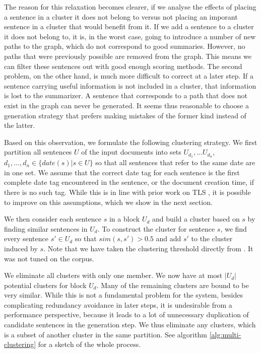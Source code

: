 \documentclass[a4paper,BCOR=10mm]{report}
\numberwithin{lemma}{chapter}
\numberwithin{definition}{chapter}
\begin{document}
The reason for this relaxation becomes clearer, if we analyse the effects of placing a sentence in a cluster it does not belong to versus not placing an imporant sentence in a cluster that would benefit from it.
If we add a sentence to a cluster it does not belong to, it is, in the worst case, going to introduce a number of new paths to the graph, which do not correspond to good summaries. However, no paths that were previously possible are removed from the graph. This means we can filter these sentences out with good enough scoring methods.
The second problem, on the other hand, is much more difficult to correct at a later step. If a sentence carrying useful information is not included in a cluster, that information is lost to the summarizer. A sentence that corresponds to a path that does not exist in the graph can never be generated. It seems thus reasonable to choose a generation strategy that prefers making mistakes of the former kind instead of the latter.

Based on this observation, we formulate the following clustering strategy. We first partition all sentences $U$ of the input documents into sets $U_{d_1}, \dots U_{d_n}$, $d_1, \dots, d_n \in \{ date(s) | s \in U \}$ so that all sentences that refer to the same date are in one set. We assume that the correct date tag for each sentence is the first complete date tag encountered in the sentence, or the document creation time, if there is no such tag. While this is in line with prior work on TLS \citep{chieu, markert}, it is possible to improve on this assumptions, which we show in the next section.

We then consider each sentence $s$ in a block $U_d$ and build a cluster based on $s$ by finding similar sentences in $U_d$.
To construct the cluster for sentence $s$, we find every sentence $s' \in U_d$ so that $\mathit{sim}(s, s') > 0.5$ and add $s'$ to the cluster induced by $s$. Note that we have taken the clustering threshold directly from \citet{banerjee}. It was not tuned on the corpus.

We eliminate all clusters with only one member. We now have at most $|U_d|$ potential clusters for block $U_d$.
Many of the remaining clusters are bound to be very similar. While this is not a fundamental problem for the system, besides complicating redundancy avoidance in later steps, it is undesirable from a performance perspective, because it leads to a lot of unnecessary duplication of candidate sentences in the generation step.
We thus eliminate any clusters, which is a subset of another cluster in the same partition. See algorithm \ref{alg:multi-clustering} for a sketch of the whole process.
\end{document}
